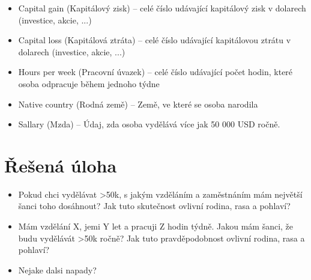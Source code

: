 \documentclass[11pt,a4paper,titlepage]{article}
\begin{document}
\begin{itemize}
                \item Capital gain (Kapitálový zisk) -- celé číslo udávající kapitálový zisk v dolarech (investice, akcie, ...)
                \item Capital loss (Kapitálová ztráta) -- celé číslo udávající kapitálovou ztrátu v dolarech (investice, akcie, ...)
                \item Hours per week (Pracovní úvazek) -- celé číslo udávající počet hodin, které osoba odpracuje během jednoho týdne
                \item Native country (Rodná země) -- Země, ve které se osoba narodila
                \item Sallary (Mzda) -- Údaj, zda osoba vydělává více jak 50 000 USD ročně.
            \end{itemize}
    
    \section{Řešená úloha}    
    \begin{itemize}
        \item Pokud chci vydělávat >50k, s jakým vzděláním a zaměstnáním mám největší šanci toho dosáhnout? Jak tuto skutečnost ovlivní rodina, rasa a pohlaví?
        \item Mám vzdělání X, jemi Y let a pracuji Z hodin týdně. Jakou mám šanci, že budu vydělávát >50k ročně? Jak tuto pravděpodobnost ovlivní rodina, rasa a pohlaví?
        \item Nejake dalsi napady?
    \end{itemize}
\end{document}

